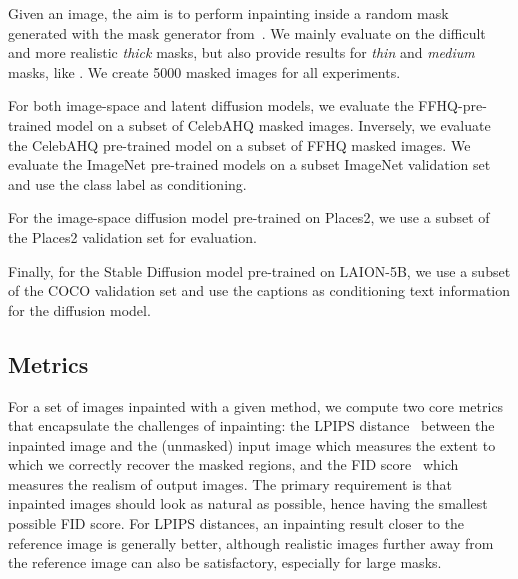Given an image, the aim is to perform inpainting inside a random mask generated with the mask generator from~\cite{lama}. 
We mainly evaluate on the difficult and more realistic \textit{thick} masks, but also provide results for \textit{thin} and 
\textit{medium} masks, like \cite{lama}. We create 5000 masked images for all experiments.

For both image-space and latent diffusion models, we evaluate the FFHQ-pre-trained model on a subset of CelebAHQ masked images. 
Inversely, we evaluate the CelebAHQ pre-trained model on a subset of FFHQ masked images. We evaluate the ImageNet pre-trained 
models on a subset ImageNet validation set and use the class label as conditioning. 

For the image-space diffusion model pre-trained on Places2, we use a subset of the Places2 validation set for evaluation.

Finally, for the Stable Diffusion model pre-trained on LAION-5B, we use a subset of the COCO validation set and use the 
captions as conditioning text information for the diffusion model. 

\subsection{Metrics}

For a set of images inpainted with a given method, we compute two core metrics that encapsulate the challenges
 of inpainting: the LPIPS distance~\citep{zhanglpips2018} between the inpainted image and the (unmasked) input image which measures 
 the extent to which we correctly recover the masked regions, and the FID score~\citep{heusel2017gans} which measures the realism 
 of output images. The primary requirement is that inpainted images should look as natural as possible, hence having the smallest 
 possible FID score. For LPIPS distances, an inpainting result closer to the reference image is generally better, although realistic 
 images further away from the reference image can also be satisfactory, especially for large masks. 


